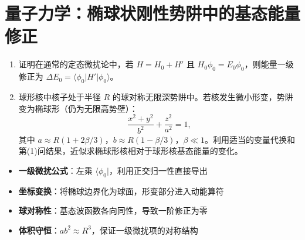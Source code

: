 \section{量子力学：椭球状刚性势阱中的基态能量修正}
\label{sec:ellipsoid-well-perturbation}

\begin{modelbox}[题目：椭球状刚性势阱中的基态能量修正]
\begin{enumerate}
    \item 证明在通常的定态微扰论中，若 $H=H_0+H'$ 且 $H_0\phi_0=E_0\phi_0$，则能量一级修正为 $\Delta E_0=\langle\phi_0|H'|\phi_0\rangle$。
    \item 球形核中核子处于半径 $R$ 的球对称无限深势阱中。若核发生微小形变，势阱变为椭球形（仍为无限高势壁）：
    \[
    \frac{x^2+y^2}{b^2}+\frac{z^2}{a^2}=1,
    \]
    其中 $a\approx R(1+2\beta/3)$，$b\approx R(1-\beta/3)$，$\beta\ll1$。利用适当的变量代换和第(1)问结果，近似求椭球形核相对于球形核基态能量的变化。
\end{enumerate}
\end{modelbox}

\begin{tipbox}[考点快速分析]
\begin{itemize}
    \item \textbf{一级微扰公式}：左乘 $\langle\phi_0|$，利用正交归一性直接导出
    \item \textbf{坐标变换}：将椭球边界化为球面，形变部分进入动能算符
    \item \textbf{球对称性}：基态波函数各向同性，导致一阶修正为零
    \item \textbf{体积守恒}：$a b^2\approx R^3$，保证一级微扰项的对称结构
\end{itemize}
\end{tipbox}


